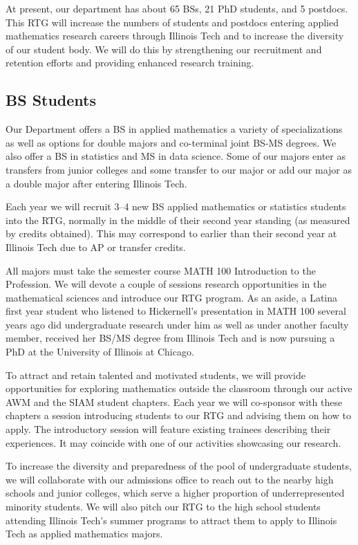 \documentclass[11pt]{NSFamsart}
\newcommand{\numUG}{65\xspace}
\newcommand{\numPhD}{21\xspace}
\newcommand{\numPostDoc}{5\xspace}
\begin{document}
At present, our department has about \numUG BSs, \numPhD PhD students, and \numPostDoc postdocs.  This RTG will increase the numbers of students and postdocs entering applied mathematics research careers through Illinois Tech and to increase the diversity of our student body.  We will do this by strengthening our recruitment and retention efforts and providing enhanced research training.

\subsection*{BS Students}
Our Department  offers a BS in applied mathematics a variety of specializations as well as options for double majors and co-terminal joint BS-MS degrees. We also offer a BS in statistics and MS in data science.  Some of our majors enter as transfers from junior colleges and some transfer to our major or add our major as a double major after entering Illinois Tech.
 
Each year we will recruit 3--4 new BS applied mathematics or statistics students into the RTG, normally in the middle of their second year standing (as measured by credits obtained).  This may correspond to earlier than their second year at Illinois Tech due to AP or transfer credits.

All majors must take the semester course MATH 100 Introduction to the Profession.  We will devote a  couple of sessions research opportunities in the mathematical sciences and introduce our RTG program. As an aside, a Latina first year student who listened to Hickernell's presentation in MATH 100 several years ago did undergraduate research under him as well as under another faculty member, received her BS/MS degree from Illinois Tech and is now pursuing a PhD at the University of Illinois at Chicago.

To attract and retain talented and motivated students, we will provide opportunities for exploring mathematics outside the classroom through our active AWM and the SIAM student chapters.  Each year we will co-sponsor with these chapters a session introducing students to our RTG and advising them on how to apply.  The introductory session will feature existing trainees describing their experiences. It may coincide with one of our activities showcasing our research.

To increase the diversity and preparedness of the pool of undergraduate students, we will collaborate with our admissions office to reach out to the nearby high schools and junior colleges, which serve a higher proportion of underrepresented minority students.  We will also pitch our RTG to the high school students attending Illinois Tech's summer programs to attract them to apply to Illinois Tech as applied mathematics majors.
\end{document}
